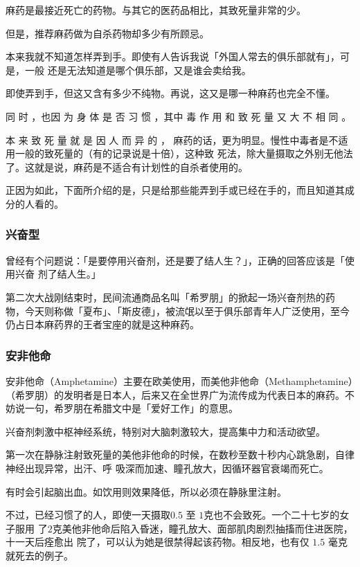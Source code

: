 \documentclass[UTF8]{ctexart}
\begin{document}
麻药是最接近死亡的药物。与其它的医药品相比，其致死量非常的少。

但是，推荐麻药做为自杀药物却多少有所顾忌。

本来我就不知道怎样弄到手。即使有人告诉我说「外国人常去的俱乐部就有」，可是，一般
还是无法知道是哪个俱乐部，又是谁会卖给我。

即使弄到手，但这又含有多少不纯物。再说，这又是哪一种麻药也完全不懂。

同 时 ，也因 为 身 体 是 否 习 惯 ，其中 毒 作 用 和 致 死 量 又 大 不 相 同 。

本 来 致 死 量 就 是 因 人 而 异 的 ， 麻药的话，更为明显。慢性中毒者是不适用一般的致死量的（有的记录说是十倍），这种致 死法，除大量摄取之外别无他法了。这就是说，麻药是不适合有计划性的自杀者使用的。

正因为如此，下面所介绍的是，只是给那些能弄到手或已经在手的，而且知道其成分的人看的。

\subsubsection*{兴奋型}

曾经有个问题说：「是要停用兴奋剂，还是要了结人生？」，正确的回答应该是「使用兴奋
剂了结人生。」

第二次大战刚结束时，民间流通商品名叫「希罗朋」的掀起一场兴奋剂热的药 物，今天则称做「夏布」、「斯皮德」，被流氓以至于俱乐部青年人广泛使用，至今仍占日本麻药界的王者宝座的就是这种麻药。

\subsubsection*{安非他命}

安非他命（Amphetamine）主要在欧美使用，而美他非他命（Methamphetamine）（希罗朋）的发明者是日本人，后来又在全世界广为流传成为代表日本的麻药。不妨说一句，希罗朋在希腊文中是「爱好工作」的意思。

兴奋剂刺激中枢神经系统，特别对大脑刺激较大，提高集中力和活动欲望。

第一次在静脉注射致死量的美他非他命的时候，在数秒至数十秒内心跳急剧，自律神经出现异常，出汗、呼
吸深而加速、瞳孔放大，因循环器官衰竭而死亡。

有时会引起脑出血。如饮用则效果降低，所以必须在静脉里注射。

不过，已经习惯了的人，即使一天摄取$0.5$ 至 $1$克也不会致死。一个二十七岁的女子服用
了$2$克美他非他命后陷入昏迷，瞳孔放大、面部肌肉剧烈抽搐而住进医院，十一天后痊愈出
院了，可以认为她是很禁得起该药物。相反地，也有仅 $1.5$ 毫克就死去的例子。
\end{document}
